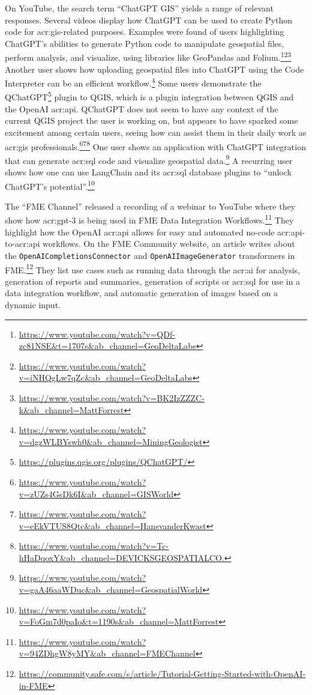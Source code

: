 On YouTube, the search term \enquote{ChatGPT GIS} yields a range of relevant responses. Several videos display how ChatGPT can be used to create Python code for \acrshort{acr:gis}-related purposes. Examples were found of users highlighting ChatGPT's abilities to generate Python code to manipulate geospatial files, perform analysis, and visualize, using libraries like GeoPandas and Folium.\footnote{\url{https://www.youtube.com/watch?v=QDf-zc81NSE&t=1707s&ab_channel=GeoDeltaLabs}}\footnote{\url{https://www.youtube.com/watch?v=iNHQgLw7qZc&ab_channel=GeoDeltaLabs}}\footnote{\url{https://www.youtube.com/watch?v=BK2IzZZZC-k&ab_channel=MattForrest}} Another user shows how uploading geospatial files into ChatGPT using the Code Interpreter can be an efficient workflow.\footnote{\url{https://www.youtube.com/watch?v=dgzWLBYswh0&ab_channel=MiningGeologist}} Some users demonstrate the QChatGPT\footnote{\url{https://plugins.qgis.org/plugins/QChatGPT/}} plugin to QGIS, which is a plugin integration between QGIS and the OpenAI \acrshort{acr:api}. QChatGPT does not seem to have any context of the current QGIS project the user is working on, but appears to have sparked some excitement among certain users, seeing how  can assist them in their daily work as \acrshort{acr:gis} professionals.\footnote{\url{https://www.youtube.com/watch?v=zUZs4GsDk6I&ab_channel=GISWorld}}\footnote{\url{https://www.youtube.com/watch?v=eEkVTUS8Qtc&ab_channel=HansvanderKwast}}\footnote{\url{https://www.youtube.com/watch?v=Tc-hHaDqoxY&ab_channel=DEVICKSGEOSPATIALCO.}} One user shows an application with ChatGPT integration that can generate \acrshort{acr:sql} code and visualize geospatial data.\footnote{\url{https://www.youtube.com/watch?v=gaA46aaWDuc&ab_channel=GeospatialWorld}} A recurring user shows how one can use LangChain and its \acrshort{acr:sql} database plugins to \enquote{unlock ChatGPT's potential}.\footnote{\url{https://www.youtube.com/watch?v=FoGm7d0paIo&t=1190s&ab_channel=MattForrest}}

The \enquote{FME Channel} released a recording of a webinar to YouTube where they show how \acrshort{acr:gpt}-3 is being used in FME Data Integration Workflows.\footnote{\url{https://www.youtube.com/watch?v=94ZDhgW8yMY&ab_channel=FMEChannel}} They highlight how the OpenAI \acrshort{acr:api} allows for easy and automated no-code \acrshort{acr:api}-to-\acrshort{acr:api} workflows. On the FME Community website, an article writes about the \texttt{OpenAICompletionsConnector} and \texttt{OpenAIImageGenerator} transformers in FME.\footnote{\url{https://community.safe.com/s/article/Tutorial-Getting-Started-with-OpenAI-in-FME}} They list use cases such as running data through the \acrshort{acr:ai} for analysis, generation of reports and summaries, generation of scripts or \acrshort{acr:sql} for use in a data integration workflow, and automatic generation of images based on a dynamic input.

